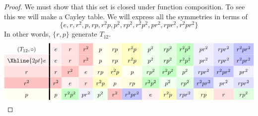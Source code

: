 \documentclass{ximera}
\begin{document}
\begin{example}
\begin{proof}
    We must show that this set is closed under function composition.
    To see this we will make a Cayley table. We will express all the
    symmetries in terms of
    \[
    \{e,r,r^2,p,rp,r^2p,p^2,rp^2,r^2p^2,pr^2,rpr^2,r^2pr^2\}
    \]
    In other words, $\{r,p\}$ generate $T_{12}$.  
    \begin{gather*}
    \renewcommand{\arraystretch}{1.6}
      \begin{array}{c!{\vline width 2pt}cccccccccccc}
      (T_{12},\circ)& e\cellcolor{red!6!white}     & r\cellcolor{red!12!white}     & r^2\cellcolor{red!24!white}   & p \cellcolor{yellow!6!white}    & rp \cellcolor{yellow!12!white}  & r^2 p\cellcolor{yellow!24!white} & p^2\cellcolor{green!6!white}    &  r p^2\cellcolor{green!12!white}  &  r^2 p^2\cellcolor{green!24!white} & pr^2 \cellcolor{blue!6!white} & rpr^2 \cellcolor{blue!12!white}& r^2 p r^2\cellcolor{blue!24!white}\\  \Xhline{2pt}
      e \cellcolor{red!6!white}         & e\cellcolor{red!6!white}         & r\cellcolor{red!12!white}           & r^2\cellcolor{red!24!white}   & p \cellcolor{yellow!6!white}    & rp \cellcolor{yellow!12!white}  & r^2 p\cellcolor{yellow!24!white} & p^2\cellcolor{green!6!white}    &  r p^2\cellcolor{green!12!white}  &  r^2 p^2\cellcolor{green!24!white} & pr^2 \cellcolor{blue!6!white} & rpr^2 \cellcolor{blue!12!white}& r^2 p r^2\cellcolor{blue!24!white}\\ 
      r\cellcolor{red!12!white}         & r\cellcolor{red!12!white}        & r^2\cellcolor{red!24!white}            & e\cellcolor{red!6!white}     & rp\cellcolor{yellow!12!white} & r^2p \cellcolor{yellow!24!white}    & p \cellcolor{yellow!6!white}   & rp^2 \cellcolor{green!12!white}  & r^2p^2 \cellcolor{green!24!white} & p^2 \cellcolor{green!6!white} & r pr^2 \cellcolor{blue!12!white} & r^2 pr^2 \cellcolor{blue!24!white} & pr^2 \cellcolor{blue!6!white}\\  
      r^2\cellcolor{red!24!white}       & r^2\cellcolor{red!24!white}      & e\cellcolor{red!6!white}           & r\cellcolor{red!12!white}    & r^2 p \cellcolor{yellow!24!white}   & p \cellcolor{yellow!6!white} & rp \cellcolor{yellow!12!white}   &  r^2p^2 \cellcolor{green!24!white}  & p^2 \cellcolor{green!6!white} & rp^2\cellcolor{green!12!white}  & r^2pr^2\cellcolor{blue!24!white} & pr^2\cellcolor{blue!6!white} & rpr^2\cellcolor{blue!12!white}\\  
      p \cellcolor{yellow!6!white}      & p \cellcolor{yellow!6!white}     & r^2p^2 \cellcolor{green!24!white}   & pr^2 \cellcolor{blue!6!white} & p^2\cellcolor{green!6!white}    & r^2\cellcolor{red!24!white}    & r^2pr^2\cellcolor{blue!24!white}  & e \cellcolor{red!6!white} & r^2p \cellcolor{yellow!24!white} &  rpr^2\cellcolor{blue!12!white}  &  rp \cellcolor{yellow!12!white}  &  r \cellcolor{red!12!white}  &  rp^2 \cellcolor{green!12!white}   \\

\end{array}
\end{gather*}
\end{proof}
\end{example}
\end{document}

